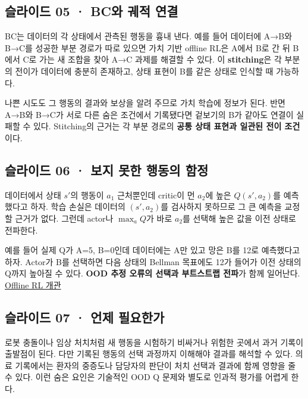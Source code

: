 \documentclass[11pt,a4paper]{article}
\begin{document}
\subsection{슬라이드 05 · BC와 궤적 연결}

BC는 데이터의 각 상태에서 관측된 행동을 흉내 낸다. 예를 들어 데이터에 A→B와 B→C를 성공한 부분 경로가 따로 있으면 가치 기반 offline RL은 A에서 B로 간 뒤 B에서 C로 가는 새 조합을 찾아 A→C 과제를 해결할 수 있다. 이 \textbf{stitching}은 각 부분의 전이가 데이터에 충분히 존재하고, 상태 표현이 B를 같은 상태로 인식할 때 가능하다.\par

나쁜 시도도 그 행동의 결과와 보상을 알려 주므로 가치 학습에 정보가 된다. 반면 A→B와 B→C가 서로 다른 숨은 조건에서 기록됐다면 겉보기의 B가 같아도 연결이 실패할 수 있다. Stitching의 근거는 각 부분 경로의 \textbf{공통 상태 표현과 일관된 전이 조건}이다.\par

\subsection{슬라이드 06 · 보지 못한 행동의 함정}

데이터에서 상태 $s'$의 행동이 $a_1$ 근처뿐인데 critic이 먼 $a_2$에 높은 $Q(s',a_2)$를 예측했다고 하자. 학습 손실은 데이터의 $(s',a_2)$를 검사하지 못하므로 그 큰 예측을 교정할 근거가 없다. 그런데 actor나 $\max_aQ$가 바로 $a_2$를 선택해 높은 값을 이전 상태로 전파한다.\par

예를 들어 실제 Q가 A=5, B=0인데 데이터에는 A만 있고 망은 B를 12로 예측했다고 하자. Actor가 B를 선택하면 다음 상태의 Bellman 목표에도 12가 들어가 이전 상태의 Q까지 높아질 수 있다. \textbf{OOD 추정 오류의 선택과 부트스트랩 전파}가 함께 일어난다. \href{https://arxiv.org/abs/2005.01643}{Offline RL 개관}\par

\subsection{슬라이드 07 · 언제 필요한가}

로봇 충돌이나 임상 처치처럼 새 행동을 시험하기 비싸거나 위험한 곳에서 과거 기록이 출발점이 된다. 다만 기록된 행동의 선택 과정까지 이해해야 결과를 해석할 수 있다. 의료 기록에서는 환자의 중증도나 담당자의 판단이 처치 선택과 결과에 함께 영향을 줄 수 있다. 이런 숨은 요인은 기술적인 OOD Q 문제와 별도로 인과적 평가를 어렵게 한다.\par
\end{document}
